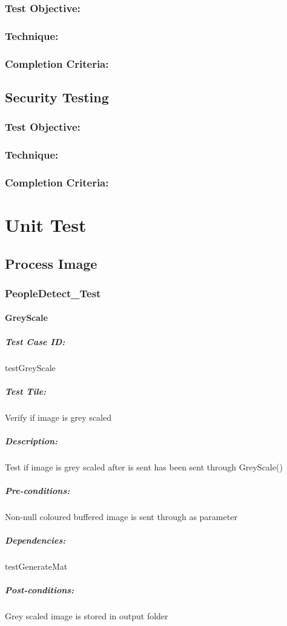 \documentclass[a4paper,12pt]{report}
\begin{document}
			\subsubsection {Test Objective:}
			\subsubsection {Technique:}
			\subsubsection {Completion Criteria:}
			
		\subsection {Security Testing}
			\subsubsection {Test Objective:}
			\subsubsection {Technique:}
			\subsubsection {Completion Criteria:}

\section {Unit Test}
	\subsection {Process Image}
		\subsubsection {PeopleDetect\_Test}
			\paragraph {GreyScale}
				\subparagraph {Test Case ID:}
					testGreyScale
				\subparagraph {Test Tile:}
					Verify if image is grey scaled
				\subparagraph {Description:}
					Test if image is grey scaled after is sent has been sent through GreyScale()
				\subparagraph {Pre-conditions:}
					Non-null coloured buffered image is sent through as parameter
				\subparagraph {Dependencies:}
					testGenerateMat				
				\subparagraph {Post-conditions:}
					Grey scaled image is stored in output folder
					
\end{document}

